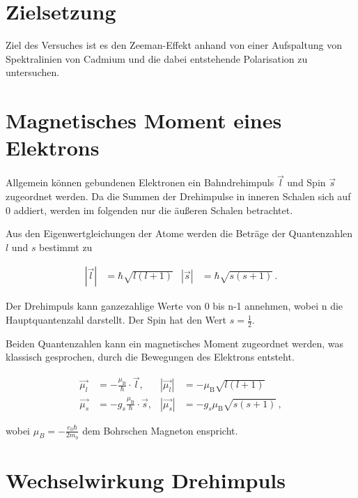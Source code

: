 \section{Zielsetzung}
Ziel des Versuches ist es den Zeeman-Effekt anhand von einer Aufspaltung von Spektralinien von Cadmium und die dabei entstehende Polarisation zu untersuchen.

\section{Magnetisches Moment eines Elektrons}
Allgemein können gebundenen Elektronen ein Bahndrehimpuls $\vec{l}$ und Spin $\vec{s}$ zugeordnet werden. Da die Summen der Drehimpulse in inneren Schalen sich auf 0 addiert, werden
im folgenden nur die äußeren Schalen betrachtet. 

\noindent
Aus den Eigenwertgleichungen der Atome werden die Beträge der Quantenzahlen $l$ und $s$ bestimmt zu 

\vspace{-25pt}
\begin{align}
    |\vec{l}| &= \hbar \sqrt{l(l+1)} & |\vec{s}| &= \hbar \sqrt{s(s+1)} \, .
\end{align}

\noindent
Der Drehimpuls kann ganzezahlige Werte von 0 bis n-1 annehmen, wobei n die Hauptquantenzahl darstellt. Der Spin hat den Wert $s=\frac{1}{2}$. 

\noindent
Beiden Quantenzahlen kann ein magnetisches Moment zugeordnet werden, was klassisch gesprochen, durch die Bewegungen des Elektrons entsteht. 

\vspace{-15pt}
\begin{align}
    \vec{\mu_l} &= - \frac{\mu_\text{B}}{\hbar} \cdot \vec{l}, & |\vec{\mu_l}|& = - \mu_\text{B} \sqrt{l(l+1)}\\
    \vec{\mu_s} &= - g_s \frac{\mu_\text{B}}{\hbar} \cdot \vec{s}, & |\vec{\mu_s}| &= - g_s \mu_\text{B} \sqrt{s(s+1)} \, ,
\end{align}

\noindent
wobei $\mu_B = -\frac{e_0 \hbar}{2 m_0}$ dem Bohrschen Magneton enspricht. 

\section{Wechselwirkung Drehimpuls}







